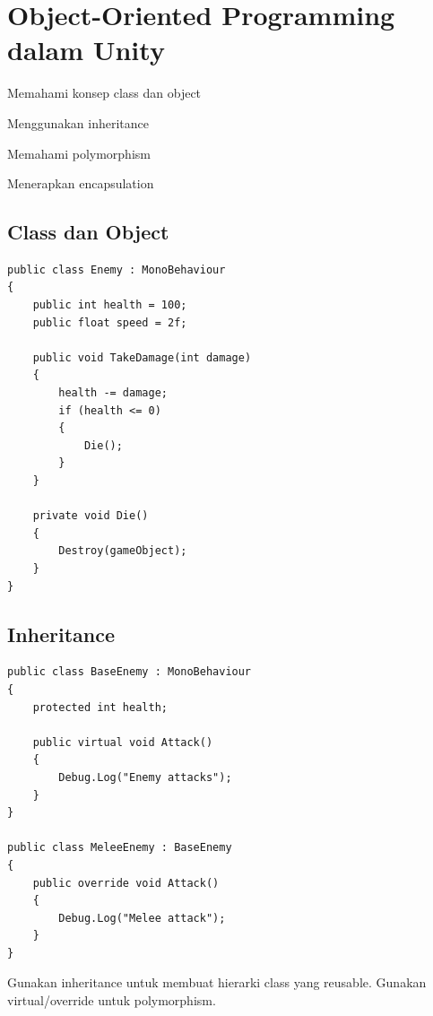 
\section{Object-Oriented Programming dalam Unity}

\begin{learningoutcomes}
\item Memahami konsep class dan object
\item Menggunakan inheritance
\item Memahami polymorphism
\item Menerapkan encapsulation
\end{learningoutcomes}

\subsection{Class dan Object}

\begin{lstlisting}[language={[Sharp]C}]
public class Enemy : MonoBehaviour
{
    public int health = 100;
    public float speed = 2f;
    
    public void TakeDamage(int damage)
    {
        health -= damage;
        if (health <= 0)
        {
            Die();
        }
    }
    
    private void Die()
    {
        Destroy(gameObject);
    }
}
\end{lstlisting}

\subsection{Inheritance}

\begin{lstlisting}[language={[Sharp]C}]
public class BaseEnemy : MonoBehaviour
{
    protected int health;
    
    public virtual void Attack()
    {
        Debug.Log("Enemy attacks");
    }
}

public class MeleeEnemy : BaseEnemy
{
    public override void Attack()
    {
        Debug.Log("Melee attack");
    }
}
\end{lstlisting}

\begin{catatan}
Gunakan inheritance untuk membuat hierarki class yang reusable. Gunakan virtual/override untuk polymorphism.
\end{catatan}
